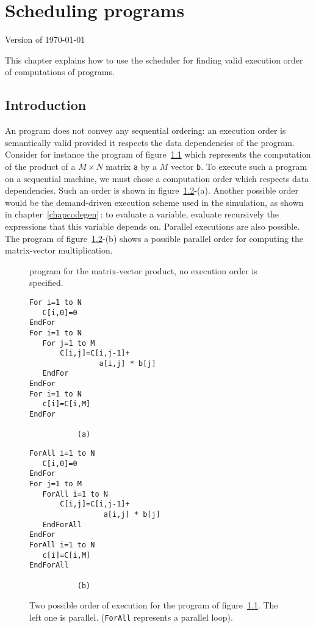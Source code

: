 \newcommand{\aalpha}{{\alfa}}
\newcommand{\lp}{{\sc lp}}
\chapter{Scheduling {\alfa} programs}
\label{chapscheduling}

{\sc Version of \today}

This chapter explains how to use the scheduler for finding valid
execution order of computations of {\alfa} programs.
 
\section{Introduction}
An {\aalpha} program does not convey any sequential ordering: an
execution order is semantically valid provided it respects the data
dependencies of the program.  Consider for instance the program of
figure~\ref{figSched1} which represents the computation of the product
of a $M\times N$ matrix \texttt{a} by a $M$ vector \texttt{b}. To execute
such a program on a sequential machine, we must chose a
computation
order which respects data dependencies. Such an
order is shown in figure~\ref{figSched2}-(a). Another possible
order would be the demand-driven execution scheme used in the
simulation, as shown in chapter~\ref{chapcodegen}\,: to evaluate a
variable, evaluate recursively the expressions that this variable
depends on.  Parallel executions are also possible. The program of
figure~\ref{figSched2}-(b) shows a possible parallel order for
computing the matrix-vector multiplication.  

\begin{figure}[htbp]

\caption{{\aalpha} program for the matrix-vector product, 
no execution order is specified.}
\label{figSched1}
\end{figure}

\begin{figure}[htbp]
\begin{minipage}{8cm}
\begin{verbatim}
For i=1 to N
   C[i,0]=0
EndFor
For i=1 to N
   For j=1 to M
       C[i,j]=C[i,j-1]+
                a[i,j] * b[j]
   EndFor
EndFor
For i=1 to N
   c[i]=C[i,M]
EndFor

           (a) 
\end{verbatim}
\end{minipage}
\begin{minipage}{8cm}
\begin{verbatim}
ForAll i=1 to N
   C[i,0]=0
EndFor
For j=1 to M
   ForAll i=1 to N
       C[i,j]=C[i,j-1]+
                 a[i,j] * b[j]
   EndForAll
EndFor
ForAll i=1 to N
   c[i]=C[i,M]
EndForAll

           (b)
\end{verbatim}
\end{minipage}
\caption{
Two possible order of execution for the program of figure~\ref{figSched1}. The 
left one is parallel. (\texttt{ForAll} represents a parallel loop).}
\label{figSched2}
\end{figure}

